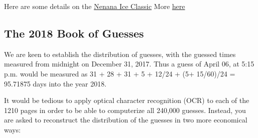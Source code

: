 \documentclass[]{book}
\begin{document}
Here are some details on the
\href{http://www.nenanaakiceclassic.com}{Nenana Ice Classic}
More \href{http://www.john-daly.com/nenana.htm}{here}

\hypertarget{the-2018-book-of-guesses}{%
\subsection{The 2018 Book of Guesses}\label{the-2018-book-of-guesses}}

We are keen to establish the distribution of guesses, with the guessed times measured from midnight on December 31, 2017. Thus a guess of April 06, at 5:15 p.m. would be measured as 31 + 28 + 31 + 5 + 12/24 + (5+ 15/60)/24 = 95.71875 days into the year 2018.

It would be tedious to apply optical character recognition (OCR) to each of the 1210 pages in order to be able to computerize all 240,000 guesses. Instead, you are asked to reconstruct the distribution of the guesses in two more economical ways:
\end{document}
